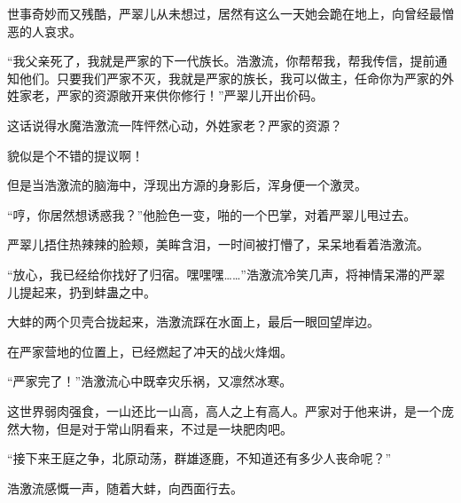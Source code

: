 \begin{this_body}
世事奇妙而又残酷，严翠儿从未想过，居然有这么一天她会跪在地上，向曾经最憎恶的人哀求。

“我父亲死了，我就是严家的下一代族长。浩激流，你帮帮我，帮我传信，提前通知他们。只要我们严家不灭，我就是严家的族长，我可以做主，任命你为严家的外姓家老，严家的资源敞开来供你修行！”严翠儿开出价码。

这话说得水魔浩激流一阵怦然心动，外姓家老？严家的资源？

貌似是个不错的提议啊！

但是当浩激流的脑海中，浮现出方源的身影后，浑身便一个激灵。

“哼，你居然想诱惑我？”他脸色一变，啪的一个巴掌，对着严翠儿甩过去。

严翠儿捂住热辣辣的脸颊，美眸含泪，一时间被打懵了，呆呆地看着浩激流。

“放心，我已经给你找好了归宿。嘿嘿嘿……”浩激流冷笑几声，将神情呆滞的严翠儿提起来，扔到蚌蛊之中。

大蚌的两个贝壳合拢起来，浩激流踩在水面上，最后一眼回望岸边。

在严家营地的位置上，已经燃起了冲天的战火烽烟。

“严家完了！”浩激流心中既幸灾乐祸，又凛然冰寒。

这世界弱肉强食，一山还比一山高，高人之上有高人。严家对于他来讲，是一个庞然大物，但是对于常山阴看来，不过是一块肥肉吧。

“接下来王庭之争，北原动荡，群雄逐鹿，不知道还有多少人丧命呢？”

浩激流感慨一声，随着大蚌，向西面行去。

\end{this_body}

